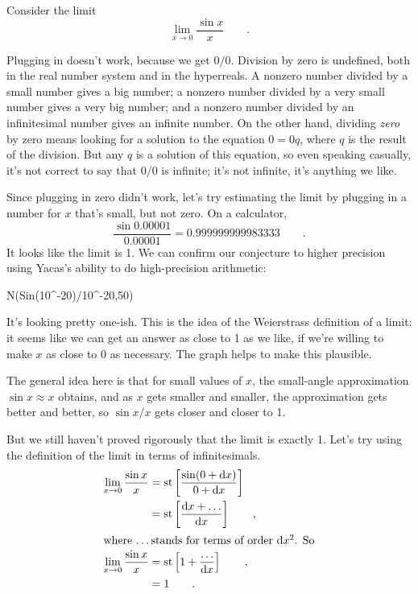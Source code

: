 Consider the limit
\begin{equation*}
  \lim_{x\rightarrow 0} \frac{\sin x}{x} \qquad .
\end{equation*}

Plugging in doesn't work, because we get $0/0$. Division by zero is undefined, both in the real number
system and in the hyperreals. A nonzero number divided by a small number gives a big
number; a nonzero number divided by a very small number gives a very big number; and a nonzero
number divided by an infinitesimal number gives an infinite number. On the other hand,
dividing \emph{zero} by zero means looking for a solution to the equation $0=0q$, where $q$ is
the result of the division. But any $q$ is a solution of this equation, so even speaking
casually, it's not correct to say that $0/0$ is infinite; it's not infinite, it's anything
we like.

Since plugging in zero didn't work, let's try estimating the limit by plugging in a number for
$x$ that's small, but not zero. On a calculator,
\begin{equation*}
  \frac{\sin 0.00001}{0.00001} = 0.999999999983333 \qquad .
\end{equation*}
It looks like the limit is 1. We can confirm our conjecture to higher precision using Yacas's
ability to do high-precision arithmetic:
\begin{Code}
  \ii N(Sin(10^-20)/10^-20,50)
\end{Code}
It's looking pretty one-ish. This is the idea of the Weierstrass definition of a limit:
it seems like we can get an answer as close to 1 as we like, if we're willing to make $x$ as close
to 0 as necessary. The graph helps to make this plausible.


The general idea here is that for small values of $x$, the small-angle approximation $\sin x\approx x$ obtains,
and as $x$ gets smaller and smaller, the approximation gets better and better, so $\sin x/x$ gets closer and closer
to 1.

But we still haven't proved rigorously that the limit is exactly 1.
Let's try using the definition of the limit in terms of
infinitesimals.
\begin{align*}
  \lim_{x\rightarrow 0} \frac{\sin x}{x} &= \text{st}\left[\frac{\sin (0+\textup{d} x)}{0+\textup{d} x}\right] \\
            &= \text{st}\left[\frac{\textup{d} x+\ldots}{\textup{d} x}\right] \qquad ,\\
\intertext{where \ldots stands for terms of order $\textup{d} x^2$. So}
  \lim_{x\rightarrow 0} \frac{\sin x}{x} &= \text{st}\left[1+\frac{\ldots}{\textup{d} x}\right] \qquad ,\\
                                         &= 1 \qquad .
\end{align*}

